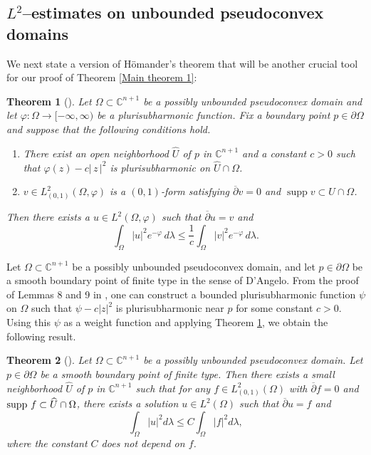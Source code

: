 \documentclass[a4paper,centertags,oneside,12pt]{amsart}
\newtheorem{theorem}{Theorem}[section]
\numberwithin{equation}{section}
\begin{document}
\subsection{$L^2$--estimates on unbounded pseudoconvex domains}
We next state a version of  H\"omander's theorem that  will be another crucial tool for our proof of Theorem \ref{Main theorem 1}:
\begin{theorem}[\cite{Ho65, GHH17, Hu}]\label{8-29-cor1}
  Let $\Omega\subset\mathbb C^{n+1}$ be a possibly unbounded pseudoconvex domain and let $\varphi\colon \Omega\to[-\infty,\infty)$ be a plurisubharmonic function.  
  Fix a boundary point $p\in\partial \Omega$ and suppose that the following conditions hold.
 \begin{enumerate}
    \item There exist an open neighborhood $\widehat U$ of $p$ in $\mathbb C^{n+1}$ and a constant $c>0$ such that $\varphi(z)-c|\,z\,|^{2}$ is plurisubharmonic on $\widehat U\cap\Omega$.
    \item $v\in L^{2}_{(0,1)}(\Omega,\varphi)$ is a $(0,1)$-form satisfying $\overline\partial v=0$ and $\operatorname{supp}v\subset \widehat U\cap \Omega$.
  \end{enumerate}
  Then there exists a  $u\in L^2(\Omega, \varphi)$  such that $\overline\partial u=v$ and
 \begin{equation*}\label{8-27-a3}
   \int_{\Omega}|u|^{2}e^{-\varphi}\,d\lambda
    \le\frac1{c}\int_{\Omega}|v|^{2}e^{-\varphi}\,d\lambda.
  \end{equation*}
\end{theorem}

Let $\Omega \subset \mathbb C^{n+1}$ be a possibly unbounded pseudoconvex domain, and let $p \in \partial \Omega$ be a smooth boundary point of finite type in the sense of D'Angelo.  
From the proof of Lemmas 8 and 9 in \cite{GHH17}, one can construct a bounded plurisubharmonic function $\psi$ on $\Omega$ such that $\psi-c|z|^2$ is  plurisubharmonic near $p$ for some constant $c>0$. 
Using this $\psi$ as a weight function and  applying Theorem \ref{8-29-cor1}, 
we obtain the following result. 
\begin{theorem}[\cite{HJL25}]\label{8-29-cor2}
Let $\Omega\subset\mathbb C^{n+1}$ be a possibly unbounded pseudoconvex domain. Let $p\in\partial \Omega$ be a smooth boundary point of finite type. Then there exists a small neighborhood $\widehat U$ of $p$ in $\mathbb C^{n+1}$ such that for any $f\in L^2_{(0, 1)}(\Omega)$ with $\overline\partial f=0$ and ${\rm supp }~f\subset \widehat U\cap {\Omega}$, there exists a solution $u\in L^2(\Omega)$ such that $\overline\partial u=f$ and $$\int_{\Omega} |u|^2d\lambda\leq C\int_{\Omega}|f|^2 d\lambda,$$
where the  constant $C$ does not depend on $f$.
\end{theorem}
\end{document}
